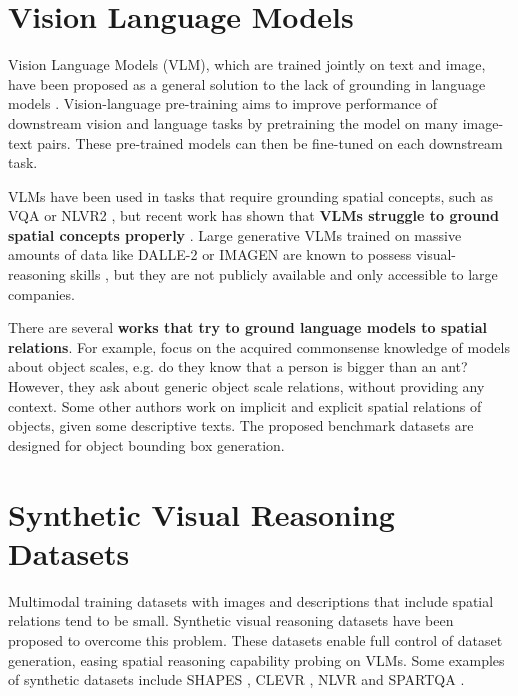 \section{Vision Language Models} \label{sec:vision_language_models}

Vision Language Models (VLM), which are trained jointly on text and image, have been proposed as a general solution to the lack of grounding in language models \cite{lu2019vilbert, tan2020lxmert, ramesh2022hierarchical, saharia2022photorealistic}. Vision-language pre-training aims to improve performance of downstream vision and language tasks by pretraining the model on many image-text pairs. These pre-trained models can then be fine-tuned on each downstream task.

VLMs have been used in tasks that require grounding spatial concepts, such as VQA \cite{antol2015vqa} or NLVR2 \cite{suhr2018corpus}, but recent work has shown that \textbf{VLMs struggle to ground spatial concepts properly} \cite{liu2022things}. Large generative VLMs trained on massive amounts of data like DALLE-2 \cite{ramesh2022hierarchical} or IMAGEN \cite{saharia2022photorealistic} are known to possess visual-reasoning skills \cite{cho2022dall}, but they are not publicly available and only accessible to large companies.

There are several \textbf{works that try to ground language models to spatial relations}. For example, \cite{bagherinezhad2016elephants, elazar2019large} focus on the acquired commonsense knowledge of models about object scales, e.g. do they know that a person is bigger than an ant? However, they ask about generic object scale relations, without providing any context. Some other authors \cite{collell2018acquiring, elu2021inferring} work on implicit and explicit spatial relations of objects, given some descriptive texts. The proposed benchmark datasets are designed for object bounding box generation.

\section{Synthetic Visual Reasoning Datasets} \label{sec:synthetic_visual_reasoning_datasets}

Multimodal training datasets with images and descriptions that include spatial relations tend to be small. Synthetic visual reasoning datasets have been proposed to overcome this problem. These datasets enable full control of dataset generation, easing spatial reasoning capability probing  on VLMs. Some examples of synthetic datasets include SHAPES \cite{andreas2016neural}, CLEVR \cite{johnson2017clevr}, NLVR \cite{suhr-etal-2017-corpus} and SPARTQA \cite{mirzaee-etal-2021-spartqa}.

